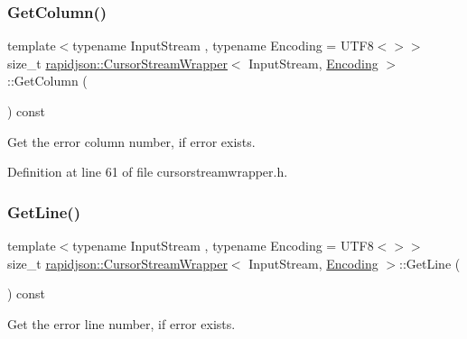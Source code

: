 \subsubsection{\texorpdfstring{GetColumn()}{GetColumn()}}
{\footnotesize\ttfamily template$<$typename Input\+Stream , typename Encoding  = U\+T\+F8$<$$>$$>$ \\
size\+\_\+t \mbox{\hyperlink{classrapidjson_1_1_cursor_stream_wrapper}{rapidjson\+::\+Cursor\+Stream\+Wrapper}}$<$ Input\+Stream, \mbox{\hyperlink{classrapidjson_1_1_encoding}{Encoding}} $>$\+::Get\+Column (\begin{DoxyParamCaption}{ }\end{DoxyParamCaption}) const}



Get the error column number, if error exists. 



Definition at line 61 of file cursorstreamwrapper.\+h.


\begin{DoxyCode}{0}

\end{DoxyCode}
\mbox{\label{classrapidjson_1_1_cursor_stream_wrapper_a97c6cbbd334911639fe522bbfdd350b7}} 
\subsubsection{\texorpdfstring{GetLine()}{GetLine()}}
{\footnotesize\ttfamily template$<$typename Input\+Stream , typename Encoding  = U\+T\+F8$<$$>$$>$ \\
size\+\_\+t \mbox{\hyperlink{classrapidjson_1_1_cursor_stream_wrapper}{rapidjson\+::\+Cursor\+Stream\+Wrapper}}$<$ Input\+Stream, \mbox{\hyperlink{classrapidjson_1_1_encoding}{Encoding}} $>$\+::Get\+Line (\begin{DoxyParamCaption}{ }\end{DoxyParamCaption}) const}



Get the error line number, if error exists. 



